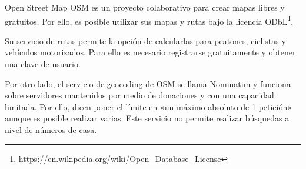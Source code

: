 \begin{definitionlist}
  \item[Open Street Map] \acs{OSM} es un proyecto colaborativo para crear mapas libres y
    gratuitos. Por ello, es posible utilizar sus mapas y rutas bajo la licencia
    ODbL\footnote{https://en.wikipedia.org/wiki/Open\_Database\_License}.

    Su servicio de rutas permite la opción de calcularlas para peatones, ciclistas y vehículos
    motorizados. Para ello es necesario registrarse gratuitamente y obtener una clave de usuario.

    Por otro lado, el servicio de geocoding de \acs{OSM} se llama Nominatim y funciona sobre
    servidores mantenidos por medio de donaciones y con una capacidad limitada. Por ello, dicen
    poner el límite en «un máximo absoluto de 1 petición» aunque es posible realizar varias. Este
    servicio no permite realizar búsquedas a nivel de números de casa.
 
\end{definitionlist}

